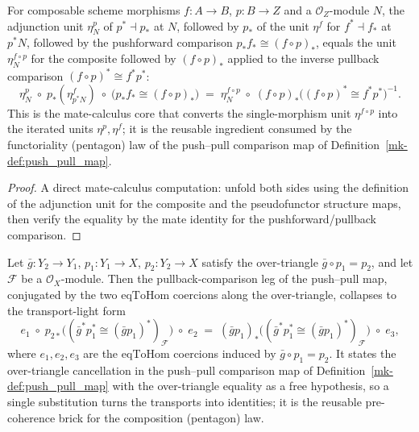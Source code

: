 \begin{lemma}\label{mk-lem:push_pull_unit_mate}
  \leanok

  For composable scheme morphisms \(f : A \to B\), \(p : B \to Z\) and a
  \(\mathcal{O}_Z\)-module \(N\), the adjunction unit \(\eta^p_N\) of
  \(p^* \dashv p_*\) at \(N\), followed by \(p_*\) of the unit \(\eta^f\) for
  \(f^* \dashv f_*\) at \(p^*N\), followed by the pushforward comparison
  \(p_* f_* \cong (f \circ p)_*\), equals the unit \(\eta^{f \circ p}_N\) for the
  composite followed by \((f \circ p)_*\) applied to the inverse pullback
  comparison \((f \circ p)^* \cong f^* p^*\):
  \[
    \eta^p_N \;\circ\; p_*(\eta^f_{p^*N}) \;\circ\;
      \bigl(p_* f_* \cong (f \circ p)_*\bigr)
    \;=\;
    \eta^{f \circ p}_N \;\circ\; (f \circ p)_*\bigl((f\circ p)^* \cong f^* p^*\bigr)^{-1}.
  \]
  This is the mate-calculus core that converts the single-morphism unit
  \(\eta^{f \circ p}\) into the iterated units \(\eta^p, \eta^f\); it is the
  reusable ingredient consumed by the functoriality (pentagon) law of the
  push--pull comparison map of Definition~\ref{mk-def:push_pull_map}.
\end{lemma}

\begin{proof}

  A direct mate-calculus computation: unfold both sides using the definition of
  the adjunction unit for the composite and the pseudofunctor structure maps, then
  verify the equality by the mate identity for the pushforward/pullback comparison.
\end{proof}

\begin{lemma}\label{mk-lem:push_pull_transport_cancel}
  \leanok

  Let \(\bar g : Y_2 \to Y_1\), \(p_1 : Y_1 \to X\), \(p_2 : Y_2 \to X\) satisfy the
  over-triangle \(\bar g \circ p_1 = p_2\), and let \(\mathcal{F}\) be a
  \(\mathcal{O}_X\)-module. Then the pullback-comparison leg of the push--pull map,
  conjugated by the two \(\mathrm{eqToHom}\) coercions along the over-triangle,
  collapses to the transport-light form
  \[
    e_1 \;\circ\; p_{2*}\bigl((\bar g^* p_1^* \cong (\bar g p_1)^*)_{\mathcal{F}}\bigr)
      \;\circ\; e_2
    \;=\;
    (\bar g p_1)_*\bigl((\bar g^* p_1^* \cong (\bar g p_1)^*)_{\mathcal{F}}\bigr)
      \;\circ\; e_3,
  \]
  where \(e_1, e_2, e_3\) are the \(\mathrm{eqToHom}\) coercions induced by
  \(\bar g \circ p_1 = p_2\). It states the over-triangle cancellation in the
  push--pull comparison map of Definition~\ref{mk-def:push_pull_map} with the
  over-triangle equality as a free hypothesis, so a single substitution turns the
  transports into identities; it is the reusable pre-coherence brick for the
  composition (pentagon) law.
\end{lemma}

